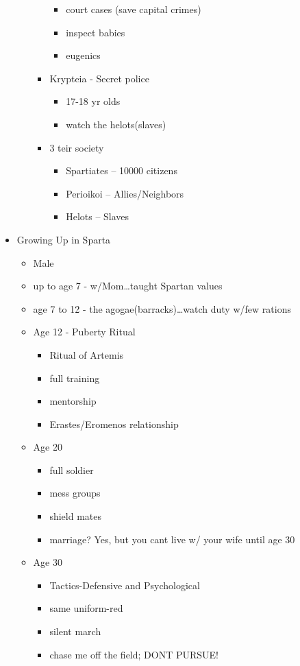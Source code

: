 \documentclass[11pt, a4paper]{article}
\begin{document}
\begin{itemize}
\begin{itemize}
\begin{itemize}
\begin{itemize}
              \item court cases (save capital crimes)
              \item inspect babies
              \item eugenics
            \end{itemize}
          \item Krypteia - Secret police
            \begin{itemize}
              \item 17-18 yr olds 
              \item watch the helots(slaves)
            \end{itemize}
          \item 3 teir society
            \begin{itemize}
              \item Spartiates -- 10000 citizens
              \item Perioikoi -- Allies/Neighbors
              \item Helots -- Slaves
            \end{itemize}
        \end{itemize}
    \end{itemize}
  \item Growing Up in Sparta
    \begin{itemize}
      \item Male
      \item up to age 7 - w/Mom\dots taught Spartan values
      \item age 7 to 12 - the agogae(barracks)\dots watch duty w/few rations
      \item Age 12 - Puberty Ritual
        \begin{itemize}
          \item Ritual of Artemis
          \item full training
          \item mentorship
          \item Erastes/Eromenos relationship
        \end{itemize}
      \item Age 20
        \begin{itemize}
          \item full soldier
          \item mess groups
          \item shield mates
          \item marriage? Yes, but you cant live w/ your wife until age 30
        \end{itemize}
      \item Age 30
        \begin{itemize}
          \item Tactics-Defensive and Psychological
          \item same uniform-red
          \item silent march
          \item chase me off the field; DONT PURSUE!
        \end{itemize}
    \end{itemize}
\end{itemize}
\end{document}
